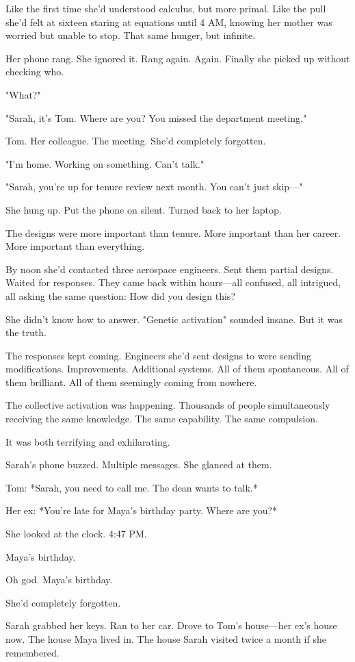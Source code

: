Like the first time she'd understood calculus, but more primal. Like the pull she'd felt at sixteen staring at equations until 4 AM, knowing her mother was worried but unable to stop. That same hunger, but infinite.

Her phone rang. She ignored it. Rang again. Again. Finally she picked up without checking who.

"What?"

"Sarah, it's Tom. Where are you? You missed the department meeting."

Tom. Her colleague. The meeting. She'd completely forgotten.

"I'm home. Working on something. Can't talk."

"Sarah, you're up for tenure review next month. You can't just skip—"

She hung up. Put the phone on silent. Turned back to her laptop.

The designs were more important than tenure. More important than her career. More important than everything.

By noon she'd contacted three aerospace engineers. Sent them partial designs. Waited for responses. They came back within hours—all confused, all intrigued, all asking the same question: How did you design this?

She didn't know how to answer. "Genetic activation" sounded insane. But it was the truth.

The responses kept coming. Engineers she'd sent designs to were sending modifications. Improvements. Additional systems. All of them spontaneous. All of them brilliant. All of them seemingly coming from nowhere.

The collective activation was happening. Thousands of people simultaneously receiving the same knowledge. The same capability. The same compulsion.

It was both terrifying and exhilarating.

Sarah's phone buzzed. Multiple messages. She glanced at them.

Tom: *Sarah, you need to call me. The dean wants to talk.*

Her ex: *You're late for Maya's birthday party. Where are you?*

She looked at the clock. 4:47 PM.

Maya's birthday.

Oh god. Maya's birthday.

She'd completely forgotten.

Sarah grabbed her keys. Ran to her car. Drove to Tom's house—her ex's house now. The house Maya lived in. The house Sarah visited twice a month if she remembered.

